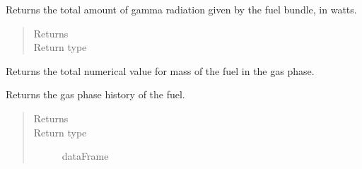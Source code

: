 \documentclass[letterpaper,10pt,openany,oneside,english]{sphinxmanual}
\begin{document}
\begin{fulllineitems}
\begin{fulllineitems}
\label{\detokenize{support_rst/fuel_bundle:fuel_bundle.FuelBundle.get_gamma_pwr}}
Returns the total amount of gamma radiation given by the fuel bundle,
in watts.
\begin{quote}\begin{description}
\item[{Returns}] \leavevmode
{}

\item[{Return type}] \leavevmode
{}

\end{description}\end{quote}

\end{fulllineitems}


\begin{fulllineitems}
\label{\detokenize{support_rst/fuel_bundle:fuel_bundle.FuelBundle.get_gas_mass}}
Returns the total numerical value for mass of the fuel in the gas
phase.

\end{fulllineitems}


\begin{fulllineitems}
\label{\detokenize{support_rst/fuel_bundle:fuel_bundle.FuelBundle.get_gas_phase}}
Returns the gas phase history of the fuel.
\begin{quote}\begin{description}
\item[{Returns}] \leavevmode
{}

\item[{Return type}] \leavevmode
dataFrame

\end{description}\end{quote}

\end{fulllineitems}



\end{fulllineitems}
\end{document}
